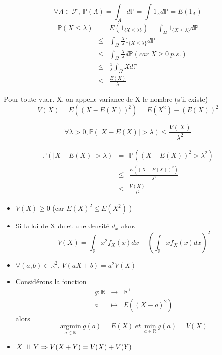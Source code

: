 \begin{dem}
\[\forall A\in \mathcal{F},\ \mathbb{P}(A)=\int_A d\mathbb{P}=\int 1_A d\mathbb{P}=E(1_A)\]
\begin{eqnarray*}
\mathbb{P}(X \leq \lambda) &=& E(1_{\{X \leq \lambda\}}) = \int_{\Omega} 1_{\{X \leq \lambda\}} d\mathbb{P} \\
&\leq& \int_{\Omega} \frac{X}{\lambda} 1_{\{X \leq \lambda\}} d\mathbb{P}\\
&\leq& \int_{\Omega} \frac{X}{\lambda} d\mathbb{P} (car\ X\geq 0\ p.s.) \\
&\leq& \frac{1}{\lambda} \int_{\Omega} X d\mathbb{P} \\
&\leq& \frac{E(X)}{\lambda}
\end{eqnarray*}
\end{dem}

\begin{Def}
Pour toute v.a.r. X, on appelle variance de X le nombre (s'il existe) \[V(X)=E\left((X-E(X))^2 \right) = E\left(X^2\right) - \left( E(X)\right)^2\]
\end{Def}

\begin{Prop}
\[\forall \lambda > 0,  \mathbb{P}(|X-E(X)| > \lambda) \leq \frac{V(X)}{\lambda^2}\]
\end{Prop}

\begin{dem}
\begin{eqnarray*}
\mathbb{P}(|X-E(X)| > \lambda) &=& \mathbb{P}\left((X-E(X))^2 > \lambda^2 \right) \\
&\leq& \frac{E\left( (X-E(X))^2 \right)}{\lambda^2} \\
&\leq& \frac{V(X)}{\lambda^2}
\end{eqnarray*}
\end{dem}

\begin{Prop}
\begin{itemize}
\item $V(X)\geq 0$ (car $E(X)^2 \leq E(X^2)$ )
\item Si la loi de X dmet une densité $d_x$ alors \[V(X)=\int_{\mathbb{R}} x^2f_X(x) dx - \left(\int_{\mathbb{R}} xf_X(x) dx\right)^2\]
\item $\forall(a,b)\in\mathbb{R}^2,\ V(aX+b)=a^2V(X)$
\item Considérons la fonction \begin{eqnarray*} g:\mathbb{R}&\rightarrow&\mathbb{R}^+ \\ a&\mapsto& E((X-a)^2) \end{eqnarray*} alors \[\underset{a\in\mathbb{R}}{\mathrm{argmin}}\ g(a)=E(X)\ et\ \min_{a\in\mathbb{R}} g(a)=V(X)\]
\item $X\perp \! \! \! \perp Y \Rightarrow V(X+Y)=V(X)+V(Y)$
\end{itemize}
\end{Prop}

